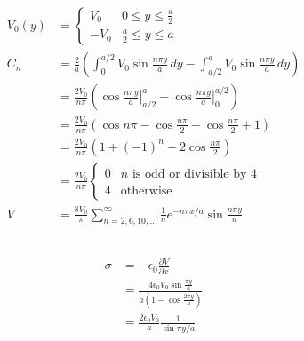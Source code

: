 \documentclass{article}
\begin{document}
\begin{align*}
  V_0(y) & = \begin{cases}
               V_0  & 0 \le y \le \frac{a}{2} \\
               -V_0 & \frac{a}{2} \le y \le a
             \end{cases}                                                                                                       \\
  C_n    & = \frac{2}{a} \left( \int_0^{a / 2} V_0 \sin \frac{n \pi y}{a} \,d y - \int_{a / 2}^a V_0 \sin \frac{n \pi y}{a} \,d y \right)         \\
         & = \frac{2 V_0}{n \pi} \left( \left. \cos \frac{n \pi y}{a} \right|_{a / 2}^a - \left. \cos \frac{n \pi y}{a} \right|_0^{a / 2} \right) \\
         & = \frac{2 V_0}{n \pi} \left( \cos n \pi - \cos \frac{n \pi}{2} - \cos \frac{n \pi}{2} + 1 \right)                                      \\
         & = \frac{2 V_0}{n \pi} \left( 1 + (-1)^n - 2 \cos \frac{n \pi}{2} \right)                                                               \\
         & = \frac{2 V_0}{n \pi} \begin{cases}
                                   0 & n \text{ is odd or divisible by } 4 \\
                                   4 & \text{otherwise}
                                 \end{cases}                                                                          \\
  V      & = \frac{8 V_0}{\pi} \sum_{n = 2, 6, 10, \ldots}^\infty \frac{1}{n} e^{-n \pi x / a} \sin \frac{n \pi y}{a}
\end{align*}

\subsection{}

\begin{align*}
  \sigma & = -\epsilon_0 \frac{\partial V}{\partial x}                                                 \\
         & = \frac{4 \epsilon_0 V_0 \sin \frac{\pi y}{a}}{a \left( 1 - \cos \frac{2 \pi y}{a} \right)} \\
         & = \frac{2 \epsilon_0 V_0}{a} \frac{1}{\sin \pi y / a}
\end{align*}
\end{document}
